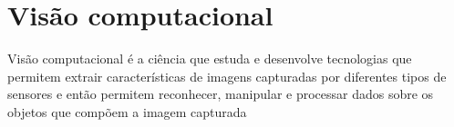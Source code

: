 









\section[Visão computacional]{Visão computacional}
Visão computacional é a ciência que estuda e desenvolve tecnologias que permitem extrair características de imagens capturadas por diferentes tipos de sensores e então permitem reconhecer, manipular e processar dados sobre os objetos que compõem a imagem capturada \cite{VisaoComp}

